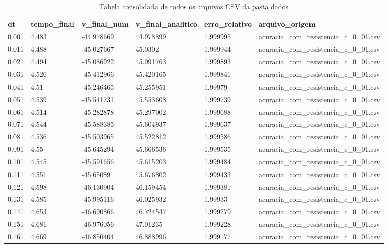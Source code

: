 \begin{table}
\caption{Tabela consolidada de todos os arquivos CSV da pasta dados}
\label{tab:consolidado_csv}
\begin{tabular}{llllll}
\toprule
dt & tempo\_final & v\_final\_num & v\_final\_analitico & erro\_relativo & arquivo\_origem \\
\midrule
0.001 & 4.483 & -44.978669 & 44.978899 & 1.999995 & acuracia\_com\_resistencia\_c\_0\_01.csv \\
0.011 & 4.488 & -45.027667 & 45.0302 & 1.999944 & acuracia\_com\_resistencia\_c\_0\_01.csv \\
0.021 & 4.494 & -45.086922 & 45.091763 & 1.999893 & acuracia\_com\_resistencia\_c\_0\_01.csv \\
0.031 & 4.526 & -45.412966 & 45.420165 & 1.999841 & acuracia\_com\_resistencia\_c\_0\_01.csv \\
0.041 & 4.51 & -45.246465 & 45.255951 & 1.99979 & acuracia\_com\_resistencia\_c\_0\_01.csv \\
0.051 & 4.539 & -45.541731 & 45.553608 & 1.999739 & acuracia\_com\_resistencia\_c\_0\_01.csv \\
0.061 & 4.514 & -45.282878 & 45.297002 & 1.999688 & acuracia\_com\_resistencia\_c\_0\_01.csv \\
0.071 & 4.544 & -45.588385 & 45.604937 & 1.999637 & acuracia\_com\_resistencia\_c\_0\_01.csv \\
0.081 & 4.536 & -45.503965 & 45.522812 & 1.999586 & acuracia\_com\_resistencia\_c\_0\_01.csv \\
0.091 & 4.55 & -45.645294 & 45.666536 & 1.999535 & acuracia\_com\_resistencia\_c\_0\_01.csv \\
0.101 & 4.545 & -45.591656 & 45.615203 & 1.999484 & acuracia\_com\_resistencia\_c\_0\_01.csv \\
0.111 & 4.551 & -45.65089 & 45.676802 & 1.999433 & acuracia\_com\_resistencia\_c\_0\_01.csv \\
0.121 & 4.598 & -46.130904 & 46.159454 & 1.999381 & acuracia\_com\_resistencia\_c\_0\_01.csv \\
0.131 & 4.585 & -45.995116 & 46.025932 & 1.99933 & acuracia\_com\_resistencia\_c\_0\_01.csv \\
0.141 & 4.653 & -46.690866 & 46.724547 & 1.999279 & acuracia\_com\_resistencia\_c\_0\_01.csv \\
0.151 & 4.681 & -46.976056 & 47.01235 & 1.999228 & acuracia\_com\_resistencia\_c\_0\_01.csv \\
0.161 & 4.669 & -46.850404 & 46.888996 & 1.999177 & acuracia\_com\_resistencia\_c\_0\_01.csv \\

\end{tabular}
\end{table}
